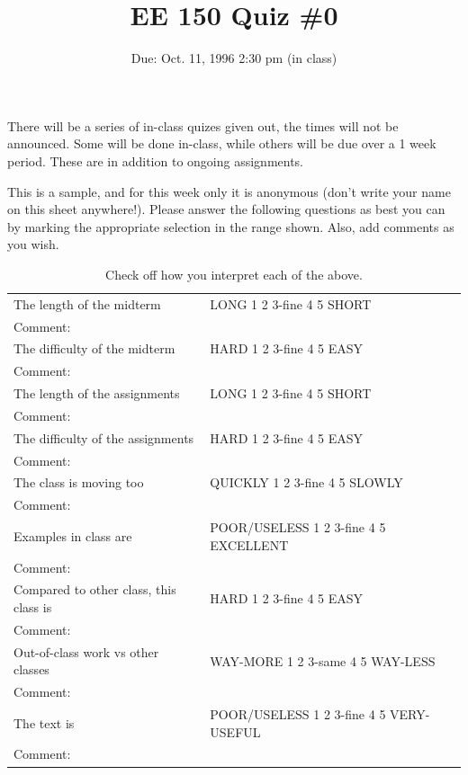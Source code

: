 \setcounter{page}{1}



\title{EE 150 Quiz \#0}
\author{Due: Oct. 11, 1996 2:30 pm (in class)}
\date{}
\maketitle

There will be a series of in-class quizes given out, the times will not be
announced.  Some will be done in-class, while others will be due over
a 1 week period.  These are in addition to ongoing assignments.

This is a sample, and for this week only it is anonymous (don't write
your name on this sheet anywhere!).  Please answer the following
questions as best you can by marking the appropriate selection in the
range shown.  Also, add comments as you wish.

\begin{table}[ht]
\begin{center}\begin{tabular}{|ll|}\hline\hline
The length of the midterm & LONG 1 2 3-fine 4 5 SHORT \\ 
Comment:~ & ~ \\ \hline
The difficulty of the midterm & HARD 1 2 3-fine 4 5 EASY \\ 
Comment:~ & ~ \\ \hline
The length of the assignments & LONG 1 2 3-fine 4 5 SHORT \\ 
Comment:~ & ~ \\ \hline
The difficulty of the assignments & HARD 1 2 3-fine 4 5 EASY \\ 
Comment:~ & ~ \\ \hline
The class is moving too & QUICKLY 1 2 3-fine 4 5 SLOWLY \\ 
Comment:~ & ~ \\ \hline
Examples in class are & POOR/USELESS 1 2 3-fine 4 5 EXCELLENT \\ 
Comment:~ & ~ \\ \hline
Compared to other class, this class is & HARD 1 2 3-fine 4 5 EASY \\ 
Comment:~ & ~ \\ \hline
Out-of-class work vs other classes & WAY-MORE 1 2 3-same 4 5 WAY-LESS \\
Comment:~ & ~ \\ \hline
The text is & POOR/USELESS 1 2 3-fine 4 5 VERY-USEFUL \\
Comment:~ & ~ \\ \hline
\end{tabular}\end{center}
\caption{Check off how you interpret each of the above.}
\end{table}

